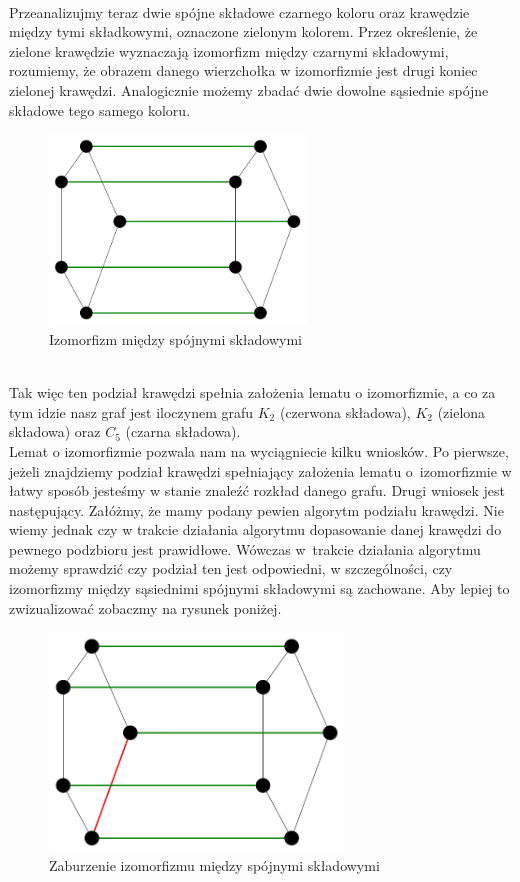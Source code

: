 \documentclass[12pt,a4paper,titlepage]{article}
\newcommand\tab[1][1cm]{\hspace*{#1}}
\begin{document}
\\
\tab[0.6cm]Przeanalizujmy teraz dwie spójne składowe czarnego koloru oraz krawędzie między tymi składkowymi, oznaczone zielonym kolorem. Przez określenie, że zielone krawędzie wyznaczają izomorfizm między czarnymi składowymi, rozumiemy, że obrazem danego wierzchołka w izomorfizmie jest drugi koniec zielonej krawędzi. Analogicznie możemy zbadać dwie dowolne sąsiednie spójne składowe tego samego koloru.
\begin{figure}[h]
\centering
\includegraphics[width = 6.8cm]{izom2.png}
\caption{Izomorfizm między spójnymi składowymi}
\end{figure}
\\
\tab[0.6cm]Tak więc ten podział krawędzi spełnia założenia lematu o izomorfizmie, a co za tym idzie nasz graf jest iloczynem grafu $K_2$ (czerwona składowa), $K_2$ (zielona składowa) oraz $C_5$ (czarna składowa). \\
\tab[0.6cm]Lemat o izomorfizmie pozwala nam na wyciągniecie kilku wniosków. Po pierwsze, jeżeli znajdziemy podział krawędzi spełniający założenia lematu o~izomorfizmie w łatwy sposób jesteśmy w stanie znaleźć rozkład danego grafu. Drugi wniosek jest następujący. Załóżmy, że mamy podany pewien algorytm podziału krawędzi. Nie wiemy jednak czy w trakcie działania algorytmu dopasowanie danej krawędzi do pewnego podzbioru jest prawidłowe. Wówczas w~trakcie działania algorytmu możemy sprawdzić czy podział ten jest odpowiedni, w szczególności, czy izomorfizmy między sąsiednimi spójnymi składowymi są zachowane. Aby lepiej to zwizualizować zobaczmy na rysunek poniżej.
\begin{figure}[h]
\centering
\includegraphics[width = 7.8cm]{izom3.png}
\caption{Zaburzenie izomorfizmu między spójnymi składowymi}
\end{figure}
\end{document}
